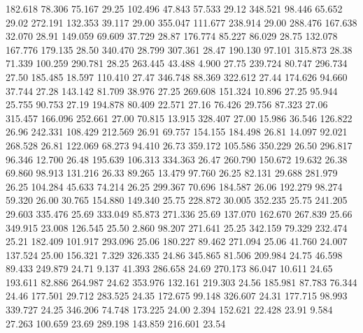  182.618   78.306   75.167        29.25
 102.496   47.843   57.533        29.12
 348.521   98.446   65.652        29.02
 272.191  132.353   39.117        29.00
 355.047  111.677  238.914        29.00
 288.476  167.638   32.070        28.91
 149.059   69.609   37.729        28.87
 176.774   85.227   86.029        28.75
 132.078  167.776  179.135        28.50
 340.470   28.799  307.361        28.47
 190.130   97.101  315.873        28.38
  71.339  100.259  290.781        28.25
 263.445   43.488    4.900        27.75
 239.724   80.747  296.734        27.50
 185.485   18.597  110.410        27.47
 346.748   88.369  322.612        27.44
 174.626   94.660   37.744        27.28
 143.142   81.709   38.976        27.25
 269.608  151.324   10.896        27.25
  95.944   25.755   90.753        27.19
 194.878   80.409   22.571        27.16
  76.426   29.756   87.323        27.06
 315.457  166.096  252.661        27.00
  70.815   13.915  328.407        27.00
  15.986   36.546  126.822        26.96
 242.331  108.429  212.569        26.91
  69.757  154.155  184.498        26.81
  14.097   92.021  268.528        26.81
 122.069   68.273   94.410        26.73
 359.172  105.586  350.229        26.50
 296.817   96.346   12.700        26.48
 195.639  106.313  334.363        26.47
 260.790  150.672   19.632        26.38
  69.860   98.913  131.216        26.33
  89.265   13.479   97.760        26.25
  82.131   29.688  281.979        26.25
 104.284   45.633   74.214        26.25
 299.367   70.696  184.587        26.06
 192.279   98.274   59.320        26.00
  30.765  154.880  149.340        25.75
 228.872   30.005  352.235        25.75
 241.205   29.603  335.476        25.69
 333.049   85.873  271.336        25.69
 137.070  162.670  267.839        25.66
 349.915   23.008  126.545        25.50
   2.860   98.207  271.641        25.25
 342.159   79.329  232.474        25.21
 182.409  101.917  293.096        25.06
 180.227   89.462  271.094        25.06
  41.760   24.007  137.524        25.00
 156.321    7.329  326.335        24.86
 345.865   81.506  209.984        24.75
  46.598   89.433  249.879        24.71
   9.137   41.393  286.658        24.69
 270.173   86.047   10.611        24.65
 193.611   82.886  264.987        24.62
 353.976  132.161  219.303        24.56
 185.981   87.783   76.344        24.46
 177.501   29.712  283.525        24.35
 172.675   99.148  326.607        24.31
 177.715   98.993  339.727        24.25
 346.206   74.748  173.225        24.00
   2.394  152.621   22.428        23.91
   9.584   27.263  100.659        23.69
 289.198  143.859  216.601        23.54
